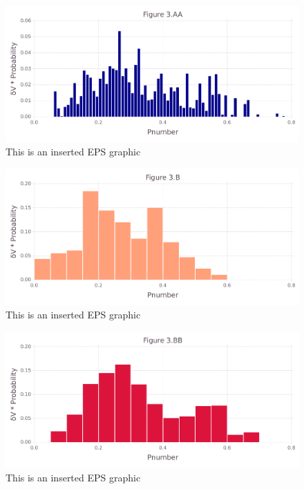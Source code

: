 \documentclass[10pt,letterpaper]{article}
\begin{document}
\begin{figure}[ht]
\begin{center}
\includegraphics[scale=0.5]{256l/3aafigure.pdf}
\caption{This is an inserted EPS graphic}
\label{fig8}
\end{center}
\end{figure}

\begin{figure}[ht]
\begin{center}
\includegraphics[scale=0.5]{256l/3bfigure.pdf}
\caption{This is an inserted EPS graphic}
\label{fig10}
\end{center}
\end{figure}

\begin{figure}[ht]
\begin{center}
\includegraphics[scale=0.5]{256l/3bbfigure.pdf}
\caption{This is an inserted EPS graphic}
\label{fig11}
\end{center}
\end{figure}
\end{document}
